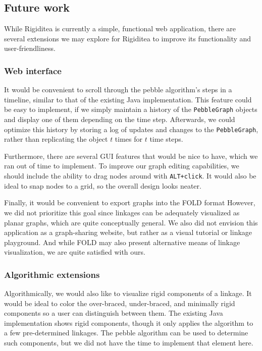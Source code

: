 \documentclass[aps,prd,final,twocolumn,letterpaper,nofootinbib]{revtex4-1}
\begin{document}
\subsection{Future work}

While Rigiditea is currently a simple, functional web application,
there are several extensions we may explore for Rigiditea
to improve its functionality and user-friendliness.

\subsubsection{Web interface}

It would be convenient to scroll through the pebble algorithm's steps
in a timeline, similar to that of the existing Java implementation.
This feature could be easy to implement,
if we simply maintain a history of the \texttt{PebbleGraph} objects
and display one of them depending on the time step.
Afterwards, we could optimize this history by storing a log
of updates and changes to the \texttt{PebbleGraph},
rather than replicating the object $t$ times for $t$ time steps.

Furthermore, there are several GUI features that would be nice to have,
which we ran out of time to implement.
To improve our graph editing capabilities,
we should include the ability to drag nodes around with \texttt{ALT+click}.
It would also be ideal to snap nodes to a grid,
so the overall design looks neater.

Finally, it would be convenient to export graphs into the FOLD format
However, we did not prioritize this goal since
linkages can be adequately visualized as planar graphs,
which are quite conceptually general.
We also did not envision this application as a graph-sharing website,
but rather as a visual tutorial or linkage playground.
And while FOLD may also present alternative means of linkage visualization,
we are quite satisfied with ours.

\subsubsection{Algorithmic extensions}

Algorithmically, we would also like to visualize rigid components of a linkage.
It would be ideal to color the over-braced,
under-braced, and minimally rigid components so a user
can distinguish between them.
The existing Java implementation shows rigid components,
though it only applies the algorithm to a few pre-determined linkages.
The pebble algorithm can be used to determine such components,
but we did not have the time to implement that element here.
\end{document}
